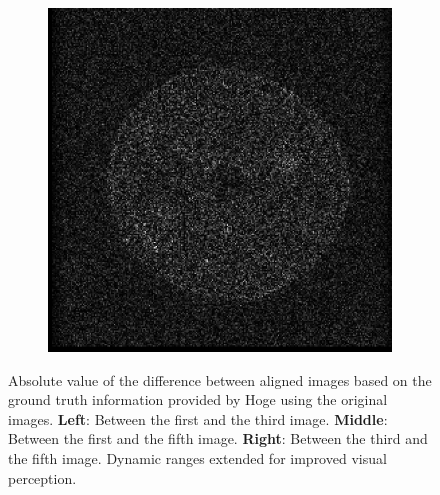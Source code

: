 \begin{figure}[htpb]
\begin{subfigure}{0.33\textwidth}
\end{subfigure}%
\begin{subfigure}{0.33\textwidth}
	\includegraphics[width=1\textwidth]{img/grapeMRIDif3with5.png}
\end{subfigure}%
\caption{Absolute value of the difference between aligned images based on the ground truth information provided by Hoge \cite{Hoge_2003} using the original images. \textbf{Left}: Between the first and the third image. \textbf{Middle}: Between the first and the fifth image. \textbf{Right}: Between the third and the fifth image. Dynamic ranges extended for improved visual perception.}
\label{fig:grapefruitMRIDiff}	
\end{figure}

